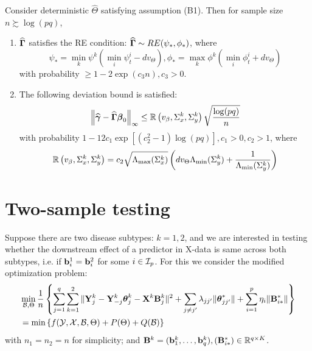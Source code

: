 \documentclass[12pt, letterpaper]{article}
\theoremstyle{definition}
\numberwithin{equation}{section}
\begin{document}
\begin{Proposition}\label{prop:ThmBetaRE}
Consider deterministic $\widehat \Theta$ satisfying assumption (B1). Then for sample size $n \succsim \log (pq)$,

\begin{enumerate}
%
\item %
$\widehat {{\boldsymbol{\Gamma}}}$ satisfies the RE condition: $ \widehat {{\boldsymbol{\Gamma}}} \sim RE (\psi_*, \phi_*)$, where 
%
$$
\psi_* = \min_k \psi^k \left( \min_i \psi_t^i - d v_\Theta \right), 
\phi_* = \max_k \phi^k \left( \min_i \phi_t^i + d v_\Theta \right)
$$
%
with probability $\geq 1 - 2 \exp(c_3 n), c_3>0$.
%
\item The following deviation bound is satisfied:
%
%
$$
\left\| \widehat {{\boldsymbol{\gamma}}} - \widehat {{\boldsymbol{\Gamma}}} {\boldsymbol{\beta}}_0 \right\|_\infty \leq {\mathbb{R}} \left(v_\beta, \Sigma_x^k, \Sigma_y^k \right) \sqrt{ \frac{ \log(pq)}{n}}
$$
%
with probability $1 - 12 c_1 \exp[ (c_2^2-1) \log (pq)], c_1>0, c_2>1$, where
$$
{\mathbb{R}} \left(v_\beta, \Sigma_x^k, \Sigma_y^k \right) = c_2 \sqrt{\Lambda_{\max} (\Sigma_x^k)} \left( d v_\Theta \Lambda_{\min} (\Sigma_y^k) +
\frac{1}{\Lambda_{\min} (\Sigma_y^k) } \right)
$$
\end{enumerate} 
\end{Proposition}

\hrulefill

\section{Two-sample testing}
Suppose there are two disease subtypes: $k = 1,2$, and we are interested in testing whether the downstream effect of a predictor in X-data is same across both subtypes, i.e. if ${\bf{b}}_i^1 = {\bf{b}}_i^2$ for some $i \in {\cal{I}}_p$. For this we consider the modified optimization problem:
%
\begin{align}
& \min_{{\cal{B}}, \Theta} \frac{1}{n} \left\{ \sum_{j=1}^q \sum_{k=1}^2 \| {\mathbf{Y}}_j^k - {\mathbf{Y}}_{-j}^k {\boldsymbol{\theta}}_j^k - {\mathbf{X}}^k {\mathbf{B}}_{j}^k \|^2 + \sum_{j \neq j'} \lambda_{jj'} \| {\boldsymbol{\theta}}_{jj'}^* \| + \sum_{i=1}^p \eta_i \| {\mathbf{B}}_{i*}^* \| \right\} \notag\\
&= \min \left\{ f ( {\cal{Y}}, {\cal{X}}, {\cal{B}}, \Theta) + P (\Theta) + Q ({\cal{B}}) \right\} 
\end{align}
%
with $n_1 = n_2 = n$ for simplicity; and ${\mathbf{B}}^k = ({\bf{b}}_1^k, \ldots, {\bf{b}}_q^k), ({\mathbf{B}}_{i*}^*) \in {\mathbb{R}}^{ q \times K}$.
\end{document}
